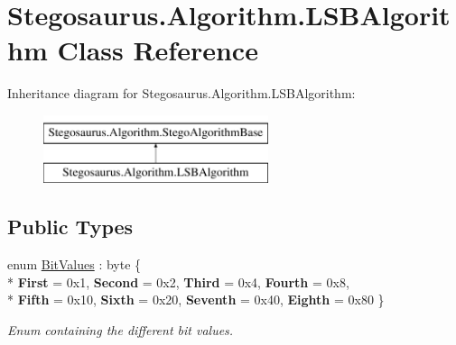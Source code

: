 \hypertarget{class_stegosaurus_1_1_algorithm_1_1_l_s_b_algorithm}{}\section{Stegosaurus.\+Algorithm.\+L\+S\+B\+Algorithm Class Reference}
\label{class_stegosaurus_1_1_algorithm_1_1_l_s_b_algorithm}
Inheritance diagram for Stegosaurus.\+Algorithm.\+L\+S\+B\+Algorithm\+:\begin{figure}[H]
\begin{center}
\leavevmode
\includegraphics[height=2.000000cm]{class_stegosaurus_1_1_algorithm_1_1_l_s_b_algorithm}
\end{center}
\end{figure}
\subsection*{Public Types}
\begin{DoxyCompactItemize}
\item 
enum \hyperlink{class_stegosaurus_1_1_algorithm_1_1_l_s_b_algorithm_a8c5aef64ddbc41d8aeab953254b3c244}{Bit\+Values} \+: byte \{ \\*
{\bfseries First} = 0x1, 
{\bfseries Second} = 0x2, 
{\bfseries Third} = 0x4, 
{\bfseries Fourth} = 0x8, 
\\*
{\bfseries Fifth} = 0x10, 
{\bfseries Sixth} = 0x20, 
{\bfseries Seventh} = 0x40, 
{\bfseries Eighth} = 0x80
 \}\begin{DoxyCompactList}\small\item\em Enum containing the different bit values. \end{DoxyCompactList}
\end{DoxyCompactItemize}
